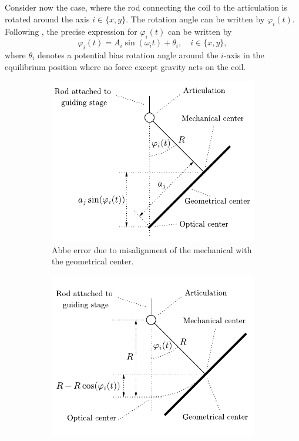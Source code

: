 \documentclass{report}
\numberwithin{tm}{section}
\begin{document}
Consider now the case, where the rod connecting the coil to the articulation is rotated around the axis $i \in \{x,y\}$. The rotation angle can be written by $\varphi_i(t)$. Following \cite[p.8]{Glardon.2024}, the precise expression for $\varphi_i(t)$ can be written by \begin{equation}\label{eq:rotation_angle}
	\varphi_i(t) = A_i\sin(\omega_i t) +  \theta_i,  \quad i \in \{x,y\},
\end{equation} where $\theta_i$ denotes a potential bias rotation angle around the $i$-axis in the equilibrium position where no force except gravity acts on the coil.
\begin{figure}[h]
	\centering
	\begin{subfigure}{0.49\textwidth}
		\centering
		\includegraphics[width=\textwidth]{figures/abbe_error_misalignment.pdf}
		\caption{Abbe error due to misalignment of the mechanical with the geometrical center.}
		\label{fig:abbe_error_misalignment}
	\end{subfigure}
	\hfill
		\begin{subfigure}{0.49\textwidth}
		\centering
		\includegraphics[width=\textwidth]{figures/abbe_error_tilt.pdf}

\end{subfigure}
\end{figure}
\end{document}

